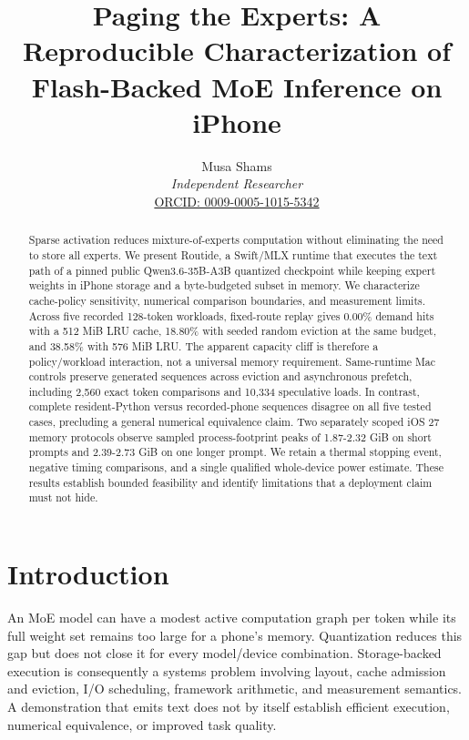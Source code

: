 \documentclass[11pt]{article}
\title{Paging the Experts: A Reproducible Characterization of Flash-Backed MoE Inference on iPhone}
\author{Musa Shams\\
\textit{Independent Researcher}\\
\href{https://orcid.org/0009-0005-1015-5342}{ORCID: 0009-0005-1015-5342}}
\date{}
\begin{document}
\maketitle

\begin{abstract}
Sparse activation reduces mixture-of-experts computation without eliminating
the need to store all experts. We present Routide, a Swift/MLX runtime that
executes the text path of a pinned public Qwen3.6-35B-A3B quantized checkpoint
while keeping expert weights in iPhone storage and a byte-budgeted subset in
memory. We characterize cache-policy sensitivity, numerical comparison
boundaries, and measurement limits. Across five recorded 128-token
workloads, fixed-route replay gives 0.00\% demand hits with a 512 MiB LRU
cache, 18.80\% with seeded random eviction at the same budget, and
38.58\% with 576 MiB LRU. The apparent capacity cliff is therefore a
policy/workload interaction, not a universal memory requirement. Same-runtime Mac controls preserve generated sequences across eviction and asynchronous
prefetch, including 2,560 exact token comparisons and 10,334
speculative loads. In contrast, complete resident-Python versus recorded-phone
sequences disagree on all five tested cases, precluding a general numerical
equivalence claim. Two separately scoped iOS 27 memory protocols observe
sampled process-footprint peaks of 1.87-2.32 GiB
on short prompts and 2.39-2.73 GiB on one
longer prompt. We retain a thermal stopping event, negative timing comparisons,
and a single qualified whole-device power estimate. These results establish
bounded feasibility and identify limitations that a deployment claim must not
hide.
\end{abstract}

\hypertarget{introduction}{%
\section{Introduction}\label{introduction}}

An MoE model can have a modest active computation graph per token while its
full weight set remains too large for a phone's memory. Quantization reduces
this gap but does not close it for every model/device combination. Storage-backed
execution is consequently a systems problem involving layout, cache admission
and eviction, I/O scheduling, framework arithmetic, and measurement semantics.
A demonstration that emits text does not by itself establish efficient
execution, numerical equivalence, or improved task quality.
\end{document}
